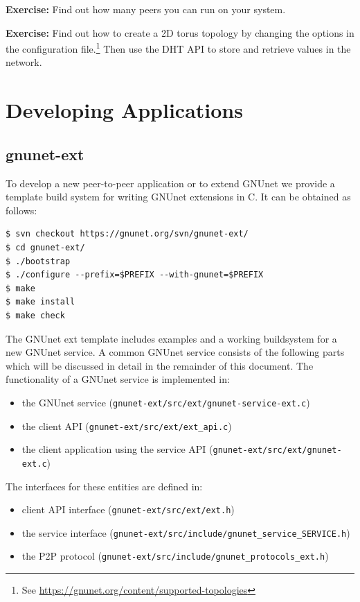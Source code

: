 \documentclass[10pt]{article}
\newcommand{\exercise}[1]{\noindent\begin{boxedminipage}{\textwidth}{\bf Exercise:} #1 \end{boxedminipage}}
\begin{document}
\exercise{Find out how many peers you can run on your system.}

\exercise{Find out how to create a 2D torus topology by changing the
  options in the configuration file.\footnote{See \url{https://gnunet.org/content/supported-topologies}}
  Then use the DHT API to store and retrieve values in the
  network.}

\section{Developing Applications}
\subsection{gnunet-ext}
To develop a new peer-to-peer application or to extend GNUnet we provide
a template build system for writing GNUnet extensions in C. It can be
obtained as follows:

\lstset{language=bash}
\begin{lstlisting}
$ svn checkout https://gnunet.org/svn/gnunet-ext/
$ cd gnunet-ext/
$ ./bootstrap
$ ./configure --prefix=$PREFIX --with-gnunet=$PREFIX
$ make
$ make install
$ make check
\end{lstlisting}

The GNUnet ext template includes examples and a working buildsystem for a new GNUnet service.
A common GNUnet service consists of the following parts which will be discussed in detail in the
remainder of this document. The functionality of a GNUnet service is implemented in:

\begin{itemize}
\itemsep0em
  \item the GNUnet service (\lstinline|gnunet-ext/src/ext/gnunet-service-ext.c|)
  \item the client API (\lstinline|gnunet-ext/src/ext/ext_api.c|)
  \item the client application using the service API (\lstinline|gnunet-ext/src/ext/gnunet-ext.c|)


\end{itemize}

The interfaces for these entities are defined in:
\begin{itemize}
\itemsep0em
  \item client API interface (\lstinline|gnunet-ext/src/ext/ext.h|)
  \item the service interface (\lstinline|gnunet-ext/src/include/gnunet_service_SERVICE.h|)
  \item the P2P protocol (\lstinline|gnunet-ext/src/include/gnunet_protocols_ext.h|)
\end{itemize}
\end{document}
